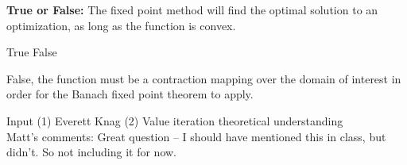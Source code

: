 \begin{questions}
\question[1] \textbf{True or False:} The fixed point method will find the optimal solution to an optimization, as long as the function is convex.
    \begin{checkboxes}
     \choice True 
     \choice False
    \end{checkboxes}
    \begin{soln}
    False, the function must be a contraction mapping over the domain of interest in order for the Banach fixed point theorem to apply.
    \end{soln}
    \begin{qauthor}
    Input (1) Everett Knag (2) Value iteration theoretical understanding \\
    Matt's comments: Great question -- I should have mentioned this in class, but didn't. So not including it for now.
    \end{qauthor}

\end{questions}